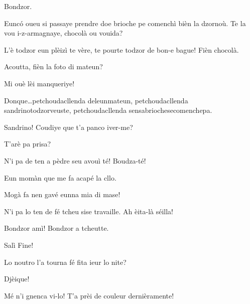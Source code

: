 \begin{drama}
\Sandrinospeaks Bondzor.

\Saventaspeaks Eunc\'o oueu si passaye prendre doe brioche pe comenchì bièn la dzornoù. Te la vou i-z-armagnaye, chocolà ou vouida?

\Sandrinospeaks L'è todzor eun plèizì te vère, te pourte todzor de bon-e bague! Fièn chocolà.


\Saventaspeaks Acoutta, fièn la foto di mateun?

\Sandrinospeaks Mi ouè lèi manqueriye!



\Saventaspeaks{} Donque\ldots petchoudacllenda deleunmateun, petchoudacllenda sandrinotodzorveuste, pe\-tchou\-da\-cllen\-da sensabriochesecomenchepa.

\Saventaspeaks {} Sandrino! Coudiye que t'a panco iver-me?

\Sandrinospeaks{} T'arè pa prisa?

\Saventaspeaks N'i pa de ten a pèdre seu avouì té! Boudza-té!

\Sandrinospeaks Eun momàn que me fa acapé la cllo.


\Saventaspeaks{} Mogà fa nen gavé eunna mia di mase!

\Sandrinospeaks N'i pa lo ten de fé tcheu sise travaille. Ah èita-là séilla!


\Saventaspeaks Bondzor amì! Bondzor a tcheutte.

\Tcheuttespeaks Salì Fine!

\Saventaspeaks{} Lo noutro l'a tourna fé fita ieur lo nite?

\Tuenospeaks Djèique!

\Richardspeaks Mé n'i gnenca vi-lo!  T'a prèi de couleur dernièramente!


\end{drama}
